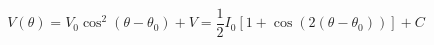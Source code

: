 \begin{equation}
\label{eq:Photodiode_Voltage}
V(\theta) = V_0 \cos^2(\theta - {\theta}_0)+ V = \frac{1}{2}I_0\left[1 + \cos(2 (\theta - \theta_0))\right]+ C
\end{equation}